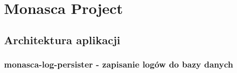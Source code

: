 \chapter[Przykładowa aplikacja]{Monasca Project}
\label{chapter:monasca}

\section{Architektura aplikacji}
\clearpage 
\clearpage 
\clearpage 
\clearpage 
\clearpage 
\subsection{monasca-log-persister - zapisanie logów do bazy danych}